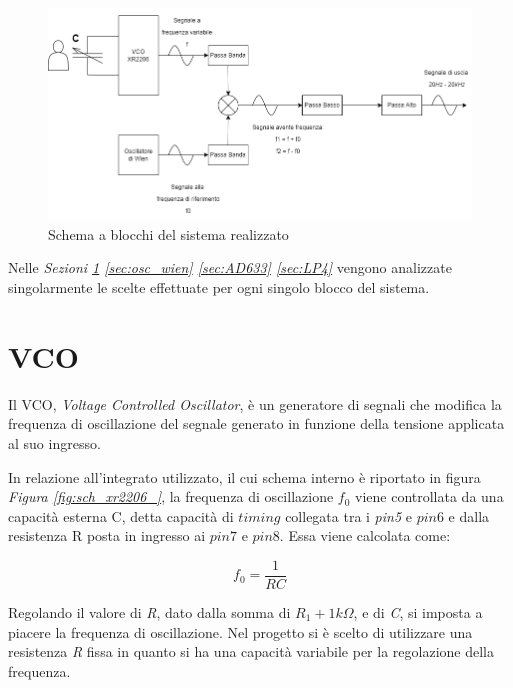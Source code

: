 \documentclass[titlepage]{report}
\begin{document}
	\begin{figure}[h]
		\centering
		\includegraphics[scale=0.5]{Immagini/Schema a blocchicompleto giusto ita.png}
		\caption{Schema a blocchi del sistema realizzato}
		\label{fig: Schema a blocchi finale}
	\end{figure}
\space
	\noindent Nelle \textit{Sezioni \ref{sec:VCO} \ref{sec:osc_wien} \ref{sec:AD633} \ref{sec:LP4}} vengono analizzate singolarmente le scelte effettuate per ogni singolo blocco del sistema.
	 
\section{VCO}
	\label{sec:VCO}
	Il VCO, \textit{Voltage Controlled Oscillator}, è un generatore di segnali che modifica la frequenza di oscillazione del segnale generato in funzione della tensione applicata al suo ingresso.
	
	\noindent In relazione all'integrato utilizzato, il cui schema interno è riportato in figura \textit{Figura \ref{fig:sch_xr2206_}}, la frequenza di oscillazione $f_0$ viene controllata da una capacità esterna C, detta capacità di $timing$ collegata tra i \textit{pin5} e $pin6$ e dalla resistenza R posta in ingresso ai $pin7$ e $pin8$. Essa viene calcolata come:
	
	\begin{equation}
		\label{eq:freq_operation}
		f_0 = \frac{1}{RC} 
	\end{equation}

	\noindent Regolando il valore di \textit{R}, dato dalla somma di $R_1 + 1k\Omega$, e di \textit{C}, si imposta a piacere la frequenza di oscillazione.
	Nel progetto si è scelto di utilizzare una resistenza \textit{R} fissa in quanto si ha una capacità variabile per la regolazione della frequenza.
\end{document}
